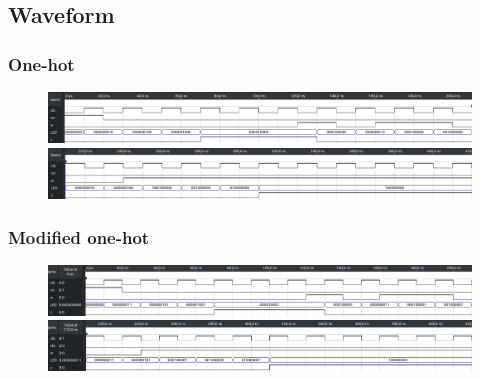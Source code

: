 \documentclass[13pt,a4paper]{report}
\begin{document}
\subsection{Waveform}
\subsubsection{One-hot}
\begin{figure}[H]
\centering
\includegraphics[scale=0.45]{images/Exc1_waveform_1.png}
\includegraphics[scale=0.45]{images/Exc1_waveform_2.png}
\end{figure}

\subsubsection{Modified one-hot}
\begin{figure}[H]
\centering
\includegraphics[scale=0.45]{images/Exc1_waveform_3.png}
\includegraphics[scale=0.45]{images/Exc1_waveform_4.png}
\end{figure}
\end{document}
